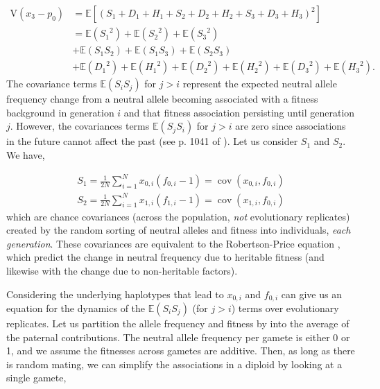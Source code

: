 \documentclass[11pt]{article}
\newcommand{\E}{\mathbb{E}}
\newcommand{\V}{\text{V}}
\newcommand{\V}{\text{V}}
\DeclareMathOperator{\cov}{cov}
\begin{document}
\begin{align}
  \label{eq:var_x}
  \V(x_3 - p_0) &= \E\left[ \left(S_1 + D_1 + H_1 + S_2 + D_2 + H_2 + S_3 + D_3 + H_3 \right)^2 \right] \nonumber \\
                  &= \E({S_1}^2) + \E({S_2}^2) + \E({S_3}^2) \nonumber \\
                  &+ \E(S_1 S_2) + \E(S_1 S_3) + \E(S_2 S_3)\nonumber \\
                  &+ \E({D_1}^2) + \E({H_1}^2) + \E({D_2}^2) + \E({H_2}^2) + \E({D_3}^2) + \E({H_3}^2).
\end{align}
%
The covariance terms $\E(S_i S_j)$ for $j > i$ represent the expected neutral
allele frequency change from a neutral allele becoming associated with a
fitness background in generation $i$ and that fitness association persisting
until generation $j$. However, the covariances terms $\E(S_j S_i)$ for $j > i$
are zero since associations in the future cannot affect the past (see p. 1041
of \cite{Buffalo2019-qs}). Let us consider $S_1$ and $S_2$. We have,

\begin{align}
  S_1 = \frac{1}{2N} \sum_{i=1}^N x_{0,i}(f_{0,i} - 1) = \cov(x_{0,i}, f_{0,i}) \nonumber \\
  S_2 = \frac{1}{2N} \sum_{i=1}^N x_{1,i}(f_{1,i} - 1) = \cov(x_{1,i}, f_{0,i})
\end{align}
%
which are chance covariances (across the population, \emph{not} evolutionary
replicates) created by the random sorting of neutral alleles and fitness into
individuals, \emph{each generation}. These covariances are equivalent to the
Robertson-Price equation \parencite{Robertson1966-fs,Price1970-si}, which
predict the change in neutral frequency due to heritable fitness (and likewise
with the change due to non-heritable factors).

Considering the underlying haplotypes that lead to $x_{0,i}$ and $f_{0,i}$ can
give us an equation for the dynamics of the $\E(S_i S_j)$ (for $j > i$) terms
over evolutionary replicates. Let us partition the allele frequency and fitness
by into the average of the paternal contributions. The neutral allele frequency
per gamete is either 0 or 1, and we assume the fitnesses across gametes are
additive. Then, as long as there is random mating, we can simplify the
associations in a diploid by looking at a single gamete,
\end{document}
